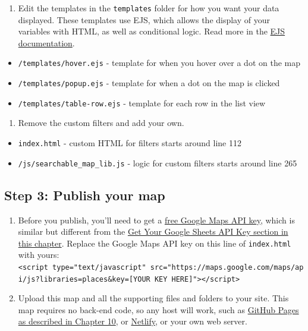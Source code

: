 \documentclass[
  english,
]{book}
\providecommand{\tightlist}{%
  \setlength{\itemsep}{0pt}\setlength{\parskip}{0pt}}
\begin{document}
\begin{enumerate}
\def\labelenumi{\arabic{enumi}.}
\setcounter{enumi}{1}
\tightlist
\item
  Edit the templates in the \texttt{templates} folder for how you want your data displayed. These templates use EJS, which allows the display of your variables with HTML, as well as conditional logic. Read more in the \href{https://ejs.co/\#docs}{EJS documentation}.
\end{enumerate}

\begin{itemize}
\tightlist
\item
  \texttt{/templates/hover.ejs} - template for when you hover over a dot on the map
\item
  \texttt{/templates/popup.ejs} - template for when a dot on the map is clicked
\item
  \texttt{/templates/table-row.ejs} - template for each row in the list view
\end{itemize}

\begin{enumerate}
\def\labelenumi{\arabic{enumi}.}
\setcounter{enumi}{2}
\tightlist
\item
  Remove the custom filters and add your own.
\end{enumerate}

\begin{itemize}
\tightlist
\item
  \texttt{index.html} - custom HTML for filters starts around line 112
\item
  \texttt{/js/searchable\_map\_lib.js} - logic for custom filters starts around line 265
\end{itemize}

\hypertarget{step-3-publish-your-map}{%
\subsection*{Step 3: Publish your map}\label{step-3-publish-your-map}}

\begin{enumerate}
\def\labelenumi{\arabic{enumi}.}
\tightlist
\item
  Before you publish, you'll need to get a \href{https://developers.google.com/maps/documentation/javascript/get-api-key}{free Google Maps API key}, which is similar but different from the \href{google-sheets-api-key.html}{Get Your Google Sheets API Key section in this chapter}. Replace the Google Maps API key on this line of \texttt{index.html} with yours: \texttt{\textless{}script\ type="text/javascript"\ src="https://maps.google.com/maps/api/js?libraries=places\&key={[}YOUR\ KEY\ HERE{]}"\textgreater{}\textless{}/script\textgreater{}}
\item
  Upload this map and all the supporting files and folders to your site. This map requires no back-end code, so any host will work, such as \href{github.html}{GitHub Pages as described in Chapter 10}, or \href{https://www.netlify.com}{Netlify}, or your own web server.
\end{enumerate}
\end{document}

